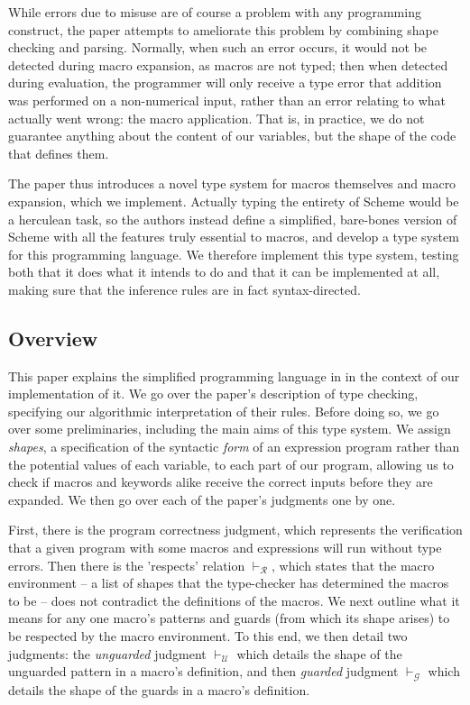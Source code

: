 \documentclass[11pt]{article}
\begin{document}
While errors due to misuse are of course a problem with any programming construct, the paper attempts to ameliorate this problem by combining shape checking and parsing. Normally, when such an error occurs, it would not be detected during macro expansion, as macros are not typed; then when detected during evaluation, the programmer will only receive a type error that addition was performed on a non-numerical input, rather than an error relating to what actually went wrong: the macro application. That is, in practice, we do not guarantee anything about the content of our variables, but the shape of the code that defines them.

The paper thus introduces a novel type system for macros themselves and macro expansion, which we implement. Actually typing the entirety of Scheme would be a herculean task, so the authors instead define a simplified, bare-bones version of Scheme with all the features truly essential to macros, and develop a type system for this programming language. We therefore implement this type system, testing both that it does what it intends to do and that it can be implemented at all, making sure that the inference rules are in fact syntax-directed.

\subsection{Overview}
This paper explains the simplified programming language in \cite{10.1007/978-3-540-30175-2_12} in the context of our implementation of it. We go over the paper's description of type checking, specifying our algorithmic interpretation of their rules. Before doing so, we go over some preliminaries, including the main aims of this type system. We assign \textit{shapes}, a specification of the syntactic \textit{form} of an expression program rather than the potential values of each variable, to each part of our program, allowing us to check if macros and keywords alike receive the correct inputs before they are expanded. We then go over each of the paper's judgments one by one.\par

First, there is the program correctness judgment, which represents the verification that a given program with some macros and expressions will run without type errors. Then there is the 'respects' relation $\vdash_{\mathcal R}$, which states that the macro environment -- a list of shapes that the type-checker has determined the macros to be -- does not contradict the definitions of the macros. We next outline what it means for any one macro's patterns and guards (from which its shape arises) to be respected by the macro environment.  To this end, we then detail two judgments: the \textit{unguarded} judgment $\vdash_{\mathcal U}$ which details the shape of the unguarded pattern in a macro's definition, and then \textit{guarded} judgment $\vdash_{\mathcal G}$ which details the shape of the guards in a macro's definition.\par
\end{document}
